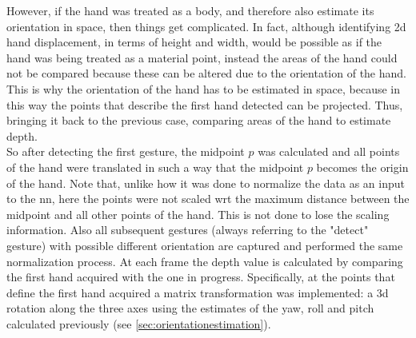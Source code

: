 \noindent However, if the hand was treated as a body, and therefore also estimate its orientation in space, then things get complicated. In fact, although identifying \gls{2d} hand displacement, in terms of height and width, would be possible as if the hand was being treated as a material point, instead the areas of the hand could not be compared because these can be altered due to the orientation of the hand. This is why the orientation of the hand has to be estimated in space, because in this way the points that describe the first hand detected can be projected. Thus, bringing it back to the previous case, comparing areas of the hand to estimate depth. \\



\noindent So after detecting the first gesture, the midpoint $p$ was calculated and all points of the hand were translated in such a way that the midpoint $p$ becomes the origin of the hand. Note that, unlike how it was done to normalize the data as an input to the \gls{nn}, here the points were not scaled \gls{wrt} the maximum distance between the midpoint and all other points of the hand. This is not done to lose the scaling information. Also all subsequent gestures (always referring to the "detect" gesture) with possible different orientation are captured and performed the same normalization process. At each frame the depth value is calculated by comparing the first hand acquired with the one in progress. Specifically, at the points that define the first hand acquired a matrix transformation was implemented: a \gls{3d} rotation along the three axes using the estimates of the yaw, roll and pitch calculated previously (see \ref{sec:orientationestimation}).

